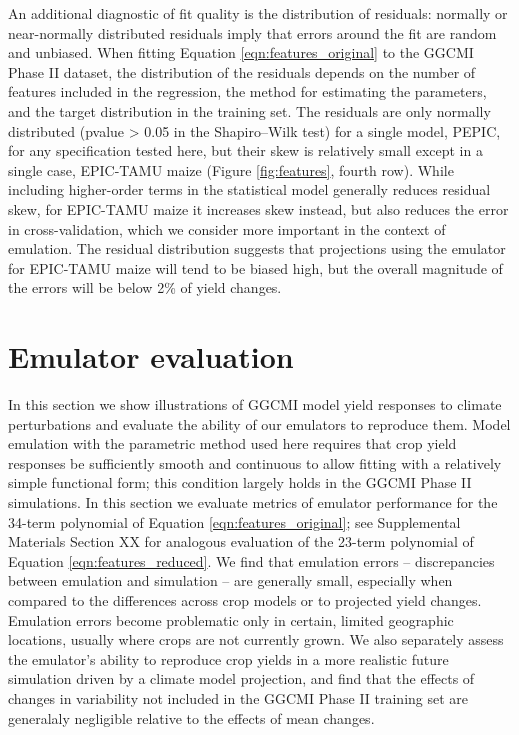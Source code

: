\documentclass[gmd, manuscript]{copernicus} %
\begin{document}
An additional diagnostic of fit quality is the distribution of residuals: normally or near-normally distributed residuals imply that errors around the fit are random and unbiased. 
When fitting Equation \ref{eqn:features_original} to the GGCMI Phase II dataset, the distribution of the residuals depends on the number of features included in the regression, the method for estimating the parameters, and the target distribution in the training set. The residuals are only normally distributed (pvalue > 0.05 in the Shapiro–Wilk test) for a single model, PEPIC, for any specification tested here, but their skew is relatively small except in a single case, EPIC-TAMU maize (Figure \ref{fig:features}, fourth row).
While including higher-order terms in the statistical model generally reduces residual skew, for EPIC-TAMU maize it increases skew instead, but also reduces the error in cross-validation, which we consider more important in the context of emulation.
The residual distribution suggests that projections using the emulator for EPIC-TAMU maize will tend to be biased high, but the overall magnitude of the errors will be below 2\% of yield changes.

\section{Emulator evaluation}
\label{S:4}
In this section we show illustrations of GGCMI model yield responses to climate perturbations and evaluate the ability of our emulators to reproduce them.   
Model emulation with the parametric method used here requires that crop yield responses be sufficiently smooth and continuous to allow fitting with a relatively simple functional form; this condition largely holds in the GGCMI Phase II simulations. 
In this section we evaluate metrics of emulator performance for the 34-term polynomial of Equation \ref{eqn:features_original}; see Supplemental Materials Section XX for analogous evaluation of the 23-term polynomial of Equation \ref{eqn:features_reduced}.
We find that emulation errors -- discrepancies between emulation and simulation --  are generally small, especially when compared to the differences across crop models or  to projected yield changes. %
Emulation errors become problematic only in certain, limited geographic locations, usually where crops are not currently grown. 
We also separately assess the emulator's ability to reproduce crop yields in a more realistic future simulation driven by a climate model projection, and find that the effects of changes in variability not included in the GGCMI Phase II training set are generalaly negligible relative to the effects of mean changes.
\end{document}
